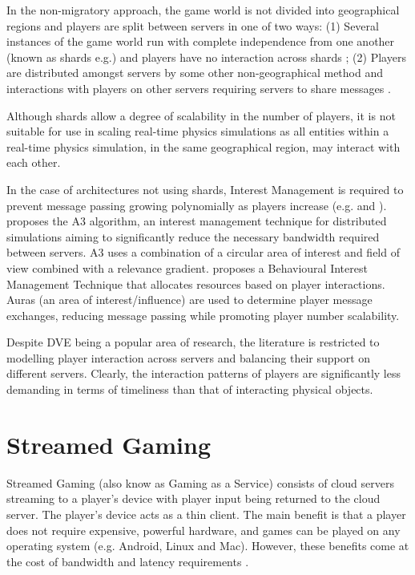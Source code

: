 In the non-migratory approach, the game world is not divided into geographical regions and players are split between servers in one of two ways: (1) Several instances of the game world run with complete independence from one another (known as shards e.g.\cite{WOW}) and players have no interaction across shards \cite{P2PForMMOs}; (2) Players are distributed amongst servers by some other non-geographical method and interactions with players on other servers requiring servers to share messages \cite{LoadBalancingforMMOs}.

Although shards allow a degree of scalability in the number of players, it is not suitable for use in scaling real-time physics simulations as all entities within a real-time physics simulation, in the same geographical region, may interact with each other.

In the case of architectures not using shards, Interest Management is required to prevent message passing growing polynomially as players increase (e.g. \cite{Bezerra2008} and \cite{LoadBalancingforMMOs}).
\cite{Bezerra2008} proposes the A3 algorithm, an interest management technique for distributed simulations aiming to significantly reduce the necessary bandwidth required between servers. A3 uses a combination of a circular area of interest and field of view combined with a relevance gradient. \cite{LoadBalancingforMMOs} proposes a Behavioural Interest Management Technique that allocates resources based on player interactions. Auras (an area of interest/influence) are used to determine player message exchanges, reducing message passing while promoting player number scalability.

Despite DVE being a popular area of research, the literature is restricted to modelling player interaction across servers and balancing their support on different servers. Clearly, the interaction patterns of players are significantly less demanding in terms of timeliness than that of interacting physical objects.

\section{Streamed Gaming}
Streamed Gaming (also know as Gaming as a Service) consists of cloud servers streaming to a player's device with player input being returned to the cloud server. The player's device acts as a thin client. The main benefit is that a player does not require expensive, powerful hardware, and games can be played on any operating system (e.g. Android, Linux and Mac). However, these benefits come at the cost of bandwidth and latency requirements \cite{iCloudAccess}.

